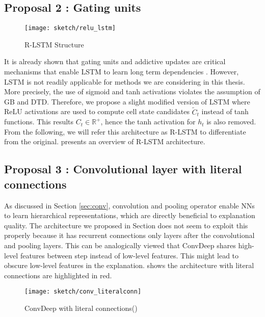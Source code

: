 \subsection{Proposal 2 : Gating units}
\begin{figure}[!htb]
\centering
\texttt{[image: sketch/relu\_lstm]}
\caption{R-LSTM Structure} 

\label{fig:relu_lstm} 
\end{figure}

It is already shown that gating units and addictive updates are critical mechanisms that enable LSTM to learn long term dependencies \cite{GreffLSTMsearchspace2017, Jozefowiczempiricalexplorationrecurrent2015a}. However, LSTM is not readily applicable for methods we are considering in this thesis. More precisely, the use of sigmoid and tanh activations violates the assumption of GB and DTD. Therefore, we propose a slight modified version of LSTM where ReLU activations are used to compute cell state candidates $\widetilde{C}_t$ instead of tanh functions. This results $C_t \in \mathbb{R}^+$, hence the tanh activation for $h_t$  is also removed.  From the following, we will refer this architecture as R-LSTM to differentiate from the original.  \addfigure{\ref{fig:relu_lstm}} presents an overview of R-LSTM architecture.


\subsection{Proposal 3 : Convolutional layer with literal connections}
As discussed in Section \ref{sec:conv}, convolution and pooling operator enable NNs to learn hierarchical representations, which are directly beneficial to explanation quality. The  architecture we proposed in Section \label{sec:rnn_cell} does not seem to exploit this properly because it has recurrent connections only layers after the convolutional and pooling layers. This can be analogically viewed that ConvDeep shares high-level features between step instead of low-level features. This might lead to obscure low-level features in the explanation. \addfigure{\ref{fig:conv_literalconn}} shows the architecture with literal connections are highlighted in red.


 \begin{figure}[!htb]
\centering
\texttt{[image: sketch/conv\_literalconn]}
\caption{ConvDeep with literal connections()} 
\label{fig:conv_literalconn}
\end{figure}

